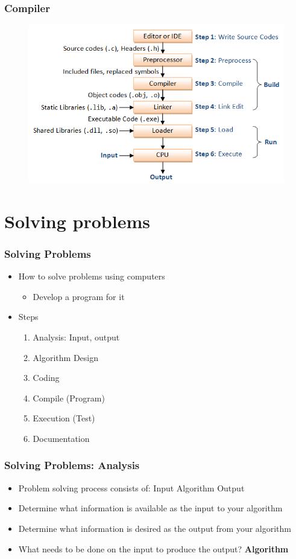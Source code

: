 \documentclass{../c-lecture}
\begin{document}
\begin{frame}
  \frametitle{Compiler}
  \begin{figure}
    \includegraphics[width=.75\textwidth]{./img/build-flow.png}
  \end{figure}
\end{frame}

\section{Solving problems}

\begin{frame}
  \frametitle{Solving Problems}
  \begin{itemize}
    \item How to solve problems using computers
    \begin{itemize}
      \item Develop a {\color{Orange} program} for it
    \end{itemize}
    \item Steps
    \begin{enumerate}
      \item Analysis: Input, output
      \item Algorithm Design
      \item Coding
      \item Compile (Program)
      \item Execution (Test)
      \item Documentation
    \end{enumerate}
  \end{itemize}
\end{frame}

\begin{frame}
  \frametitle{Solving Problems: Analysis}

  \begin{itemize}
    \item Problem solving process consists of: Input Algorithm Output
    \item Determine what information is available as the input to your algorithm
    \item Determine what information is desired as the output from your algorithm
    \item
      What needs to be done on the input to produce the output?
      \textbf{\color{Orange} Algorithm}
  \end{itemize}
\end{frame}
\end{document}
